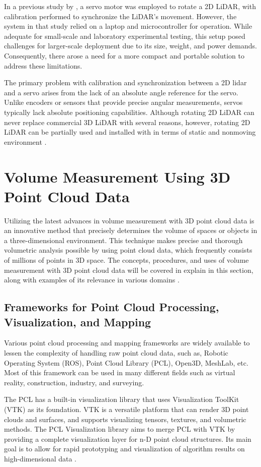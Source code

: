 In a previous study by \citet{clar2022}, a servo motor was employed to rotate a 2D LiDAR, with calibration performed to synchronize the LiDAR's movement. However, the system in that study relied on a laptop and microcontroller for operation. While adequate for small-scale and laboratory experimental testing, this setup posed challenges for larger-scale deployment due to its size, weight, and power demands. Consequently, there arose a need for a more compact and portable solution to address these limitations.

The primary problem with calibration and synchronization between a 2D lidar and a servo arises from the lack of an absolute angle reference for the servo. Unlike encoders or sensors that provide precise angular measurements, servos typically lack absolute positioning capabilities. Although rotating 2D LiDAR can never replace commercial 3D LiDAR with several reasons, however, rotating 2D LiDAR can be partially used and installed with in terms of static and nonmoving environment \citep{bi2021}.

\section{Volume Measurement Using 3D Point Cloud Data}

Utilizing the latest advances in volume measurement with 3D point cloud data is an innovative method that precisely determines the volume of spaces or objects in a three-dimensional environment. This technique makes precise and thorough volumetric analysis possible by using point cloud data, which frequently consists of millions of points in 3D space. The concepts, procedures, and uses of volume measurement with 3D point cloud data will be covered in explain in this section, along with examples of its relevance in various domains \citep{zhi2016,meng2023}.

\subsection{Frameworks for Point Cloud Processing, Visualization, and Mapping}
Various point cloud processing and mapping frameworks are widely available to lessen the complexity of handling raw point cloud data, such as, Robotic Operating System (ROS), Point Cloud Library (PCL), Open3D, MeshLab, etc. Most of this framework can be used in many different fields such as virtual reality, construction, industry, and surveying.

The PCL has a built-in visualization library that uses Visualization ToolKit (VTK) as its foundation. VTK is a versatile platform that can render 3D point clouds and surfaces, and supports visualizing tensors, textures, and volumetric methods. The PCL Visualization library aims to merge PCL with VTK by providing a complete visualization layer for n-D point cloud structures. Its main goal is to allow for rapid prototyping and visualization of algorithm results on high-dimensional data \citep{rusu2011}.

